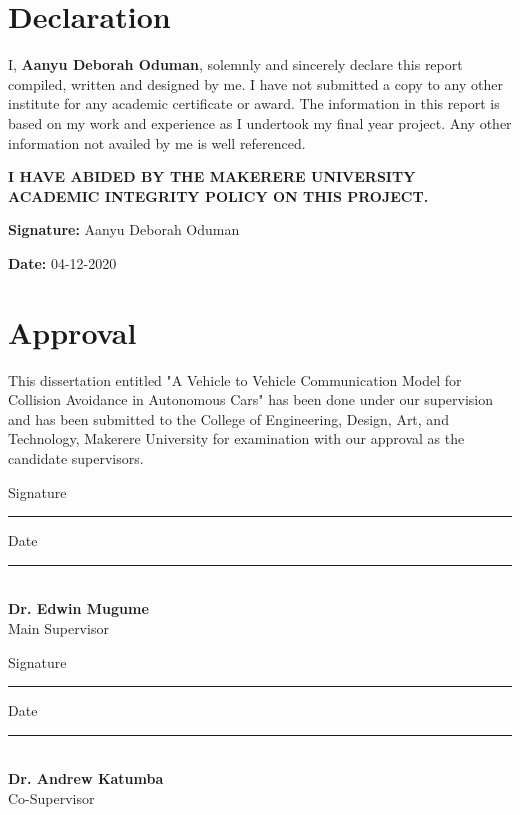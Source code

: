 \documentclass[12pt]{report}
\begin{document}
				


\section*{Declaration}

I, \textbf {Aanyu Deborah Oduman}, solemnly and sincerely declare this report compiled, written and designed by me. I have not submitted a copy to any other institute for any academic certificate or award. The information in this report is based on my work and experience as I undertook my final year project. Any other information not availed by me is well referenced.

\textbf{I HAVE ABIDED BY THE MAKERERE UNIVERSITY ACADEMIC INTEGRITY POLICY ON THIS PROJECT.}

\bigskip

\begin{multicols}{2}
	\textbf{Signature:} Aanyu Deborah Oduman 
	
	\textbf{Date: } 04-12-2020
\end{multicols}


\newpage



\section*{Approval}

This dissertation entitled "A Vehicle to Vehicle Communication Model for Collision Avoidance in Autonomous Cars" has been done under our supervision and has been submitted to the College of Engineering, Design, Art, and Technology, Makerere University for examination with our approval as the candidate supervisors.


\vspace{2cm}

Signature \rule{2in}{0.4pt}\hspace{1cm} Date \rule{2in}{0.4pt} \\
\textbf{Dr. Edwin Mugume} \\
Main Supervisor\\

\vspace{1cm}

Signature \rule{2in}{0.4pt}\hspace{1cm} Date \rule{2in}{0.4pt} \\
\textbf{Dr. Andrew Katumba } \\
Co-Supervisor
\end{document}
